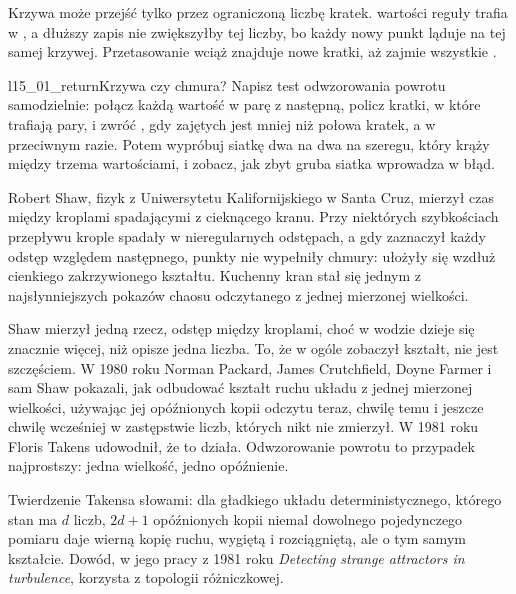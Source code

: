 

\noindent
Krzywa może przejść tylko przez ograniczoną liczbę kratek. 
wartości reguły trafia w , a dłuższy zapis nie zwiększyłby
tej liczby, bo każdy nowy punkt ląduje na tej samej krzywej. Przetasowanie
wciąż znajduje nowe kratki, aż zajmie wszystkie .

\begin{lab}{l15_01_return}{Krzywa czy chmura?}
Napisz test odwzorowania powrotu samodzielnie: połącz każdą wartość w parę z
następną, policz kratki, w które trafiają pary, i zwróć , gdy
zajętych jest mniej niż połowa kratek, a  w przeciwnym razie.
Potem wypróbuj siatkę dwa na dwa na szeregu, który krąży między trzema
wartościami, i zobacz, jak zbyt gruba siatka wprowadza w błąd.
\end{lab}

\begin{worldbox}
Robert Shaw, fizyk z Uniwersytetu Kalifornijskiego w Santa Cruz, mierzył
czas między kroplami spadającymi z cieknącego kranu. Przy niektórych
szybkościach przepływu krople spadały w nieregularnych odstępach, a gdy
zaznaczył każdy odstęp względem następnego, punkty nie wypełniły chmury:
ułożyły się wzdłuż cienkiego zakrzywionego kształtu. Kuchenny kran stał się
jednym z najsłynniejszych pokazów chaosu odczytanego z jednej mierzonej
wielkości.
\end{worldbox}

\noindent
Shaw mierzył jedną rzecz, odstęp między kroplami, choć w wodzie dzieje się
znacznie więcej, niż opisze jedna liczba. To, że w ogóle zobaczył kształt,
nie jest szczęściem. W 1980 roku Norman Packard, James Crutchfield, Doyne
Farmer i sam Shaw pokazali, jak odbudować kształt ruchu układu z jednej
mierzonej wielkości, używając jej opóźnionych kopii \dash{} odczytu teraz,
chwilę temu i jeszcze chwilę wcześniej \dash{} w zastępstwie liczb, których
nikt nie zmierzył. W 1981 roku Floris Takens udowodnił, że to działa.
Odwzorowanie powrotu to przypadek najprostszy: jedna wielkość, jedno
opóźnienie.

\begin{rigourbox}
Twierdzenie Takensa słowami: dla gładkiego układu deterministycznego, którego
stan ma $d$ liczb, $2d + 1$ opóźnionych kopii niemal dowolnego pojedynczego
pomiaru daje wierną kopię ruchu, wygiętą i rozciągniętą, ale o tym samym
kształcie. Dowód, w jego pracy z 1981 roku \emph{Detecting strange
attractors in turbulence}, korzysta z topologii różniczkowej.
\end{rigourbox}

